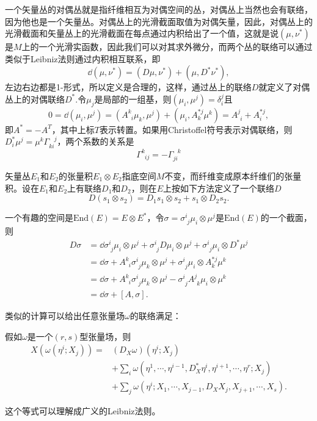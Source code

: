 一个矢量丛的对偶丛就是指纤维相互为对偶空间的丛，对偶丛上当然也会有联络，因为他也是一个矢量丛。对偶丛上的光滑截面取值为对偶矢量，因此，对偶丛上的光滑截面和矢量丛上的光滑截面在每点通过内积给出了一个值，这就是说$(\mu,\nu^*)$是$M$上的一个光滑实函数，因此我们可以对其求外微分，而两个丛的联络可以通过类似于Leibniz法则通过内积相互联系，即
\[
	\dd (\mu,\nu^*)=(D\mu,\nu^*)+(\mu,D^*\nu^*),
\]
左边右边都是1-形式，所以定义是合理的，这样，通过丛上的联络$D$就定义了对偶丛上的对偶联络$D^*$.令$\mu_j$是局部的一组基，则$(\mu_i,\mu^j)=\delta_{i}^j$且
\[
	0=\dd(\mu_i,\mu^j)=(A^k_{\phantom{k}i}\mu_k,\mu^j)+(\mu_i, A_{k}^{*j}\mu^k)=A^j_{\phantom{j}i}+A_{i}^{*j},
\]
即$A^*=-A^T$，其中上标$T$表示转置。如果用Christoffel符号表示对偶联络，则$D^*_{i}\mu^j=\mu^k\Gamma_{ki}^{\phantom{ki}j}$，两个系数的关系是
\[
	\Gamma_{\phantom{k}ij}^{k}=-\Gamma_{ji}^{\phantom{ji}k}
\]

\begin{defi}
矢量丛$E_1$和$E_2$的张量积$E_1\otimes E_2$指底空间$M$不变，而纤维变成原本纤维们的张量积。设在$E_1$和$E_2$上有联络$D_1$和$D_2$，则在$E$上按如下方法定义了一个联络$D$
\[
	D(s_1\otimes s_2)=D_1s_1\otimes  s_2+s_1\otimes D_2s_2.
\]
\end{defi}

一个有趣的空间是$\mathrm{End}(E)=E\otimes E^*$，令$\sigma=\sigma^{i}_{\phantom{i}j}\mu_i\otimes \mu^j$是$\mathrm{End}(E)$的一个截面，则
\begin{align*}
	D\sigma&=\dd \sigma^{i}_{\phantom{i}j} \mu_i\otimes \mu^j+\sigma^{i}_{\phantom{i}j}D\mu_i\otimes \mu^j+\sigma^{i}_{\phantom{i}j}\mu_i\otimes D^*\mu^j\\
	&=\dd \sigma+A_{\phantom{k}i}^{k}\sigma^{i}_{\phantom{i}j}\mu_k\otimes \mu^j+\sigma^{i}_{\phantom{i}j}\mu_i\otimes A_{k}^{*j}\mu^k\\
	&=\dd \sigma+A_{\phantom{k}i}^{k}\sigma^{i}_{\phantom{i}j}\mu_k\otimes \mu^j-\sigma^{i}_{\phantom{i}j}A_{\phantom{j}k}^{j}\mu_i\otimes\mu^k\\
	&=\dd \sigma+[A,\sigma].
\end{align*}

类似的计算可以给出任意张量场$\omega$的联络满足：
\begin{pro}假如$\omega$是一个$(r,s)$型张量场，则
\begin{align*}
	X(\omega(\eta^i;X_j))=&(D_X\omega)(\eta^i;X_j)\\
	&+\sum_i \omega\left(\eta^{1},\cdots,\eta^{i-1},D^*_X \eta^i,\eta^{i+1},\cdots,\eta^r;X_j\right)\\
	&+\sum_j \omega\left(\eta^i;X_{1},\cdots,X_{j-1},D_X X_j,X_{j+1},\cdots,X_s\right).
\end{align*}
\end{pro}
这个等式可以理解成广义的Leibniz法则。
